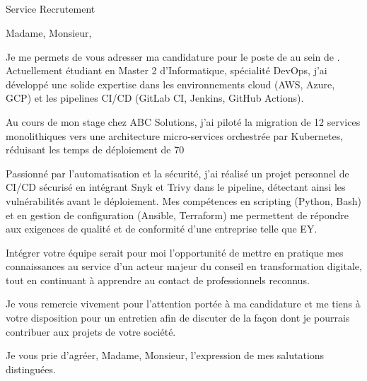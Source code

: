 \begin{flushright}
\textcolor{headercolor}{\textbf{\CandidateName}}\\[2pt]
\CandidateTitle\\[2pt]
\textcolor{accentcolor}{\CandidateEmail}\\
\CandidatePhone
\end{flushright}

\begin{letter}{\CompanyName\\ Service Recrutement}
\opening{Madame, Monsieur,}

Je me permets de vous adresser ma candidature pour le poste de \textbf{\textcolor{headercolor}{\Position}} au sein de \textcolor{headercolor}{\CompanyName}. Actuellement étudiant en Master 2 d’Informatique, spécialité DevOps, j’ai développé une solide expertise dans les environnements cloud (AWS, Azure, GCP) et les pipelines CI/CD (GitLab CI, Jenkins, GitHub Actions).  

Au cours de mon stage chez \textcolor{accentcolor}{ABC Solutions}, j’ai piloté la migration de 12 services monolithiques vers une architecture micro‑services orchestrée par Kubernetes, réduisant les temps de déploiement de 70 %

Passionné par l’automatisation et la sécurité, j’ai réalisé un projet personnel de CI/CD sécurisé en intégrant Snyk et Trivy dans le pipeline, détectant ainsi les vulnérabilités avant le déploiement. Mes compétences en scripting (Python, Bash) et en gestion de configuration (Ansible, Terraform) me permettent de répondre aux exigences de qualité et de conformité d’une entreprise telle que \textcolor{headercolor}{EY}.  

Intégrer votre équipe serait pour moi l’opportunité de mettre en pratique mes connaissances au service d’un acteur majeur du conseil en transformation digitale, tout en continuant à apprendre au contact de professionnels reconnus.  

Je vous remercie vivement pour l’attention portée à ma candidature et me tiens à votre disposition pour un entretien afin de discuter de la façon dont je pourrais contribuer aux projets de votre société.

\closing{Je vous prie d’agréer, Madame, Monsieur, l’expression de mes salutations distinguées.}
\end{letter}